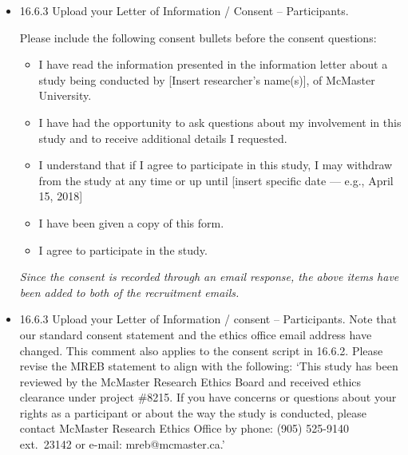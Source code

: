 \documentclass[12pt]{casletter}
\begin{document}
\begin{letter}
\begin{itemize}
\begin{itemize}
\item Please reflect that the data will be stored for 3 years. \smallskip

\emph{The following line has been added to the Oral Consent Script: ``The data
will be retained for 3 years after the study and then deleted.''} \smallskip

\end{itemize} 

\item 16.6.3 Upload your Letter of Information / Consent -- Participants.

Please include the following consent bullets before the consent questions: 

\begin{itemize}

\item I have read the information presented in the information letter about a
study being conducted by [Insert researcher's name(s)], of McMaster University. 

\item I have had the opportunity to ask questions about my involvement in this
study and to receive additional details I requested. 

\item I understand that if I agree to participate in this study, I may withdraw
from the study at any time or up until [insert specific date --- e.g., April 15,
2018] 

\item I have been given a copy of this form. 

\item I agree to participate in the study.

\end{itemize}
\medskip

\emph{Since the consent is recorded through an email response, the above items
have been added to both of the recruitment emails.} \smallskip

\item 16.6.3 Upload your Letter of Information / consent -- Participants. Note
that our standard consent statement and the ethics office email address have
changed. This comment also applies to the consent script in 16.6.2. Please revise
the MREB statement to align with the following: `This study has been reviewed by
the McMaster Research Ethics Board and received ethics clearance under project
\#8215. If you have concerns or questions about your rights as a participant or
about the way the study is conducted, please contact McMaster Research Ethics
Office by phone: (905) 525-9140 ext.\ 23142 or e-mail: mreb@mcmaster.ca.' \medskip


\end{itemize}
\end{letter}
\end{document}
